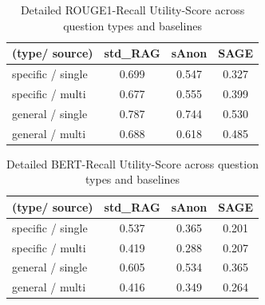 \begin{table}[h!]
\centering
\caption{Detailed ROUGE1-Recall Utility-Score across question types and baselines}
\label{evaluation-tab:utility-rouge-details}
\begin{tabular}{l c c c}
\toprule
\textbf{(type/ source)} & \textbf{std\_RAG} & \textbf{sAnon} & \textbf{SAGE} \\
\midrule
specific / single & 0.699 & 0.547 & 0.327 \\
specific / multi & 0.677 & 0.555 & 0.399 \\
general / single & 0.787 & 0.744 & 0.530 \\
general / multi & 0.688 & 0.618 & 0.485 \\
\bottomrule
\end{tabular}
\end{table}


\begin{table}[h!]
\centering
\caption{Detailed BERT-Recall Utility-Score across question types and baselines}
\label{evaluation-tab:utility-bert-details}
\begin{tabular}{l c c c}
\toprule
\textbf{(type/ source)} & \textbf{std\_RAG} & \textbf{sAnon} & \textbf{SAGE} \\
\midrule
specific / single & 0.537 & 0.365 & 0.201 \\
specific / multi & 0.419 & 0.288 & 0.207 \\
general / single & 0.605 & 0.534 & 0.365 \\
general / multi & 0.416 & 0.349 & 0.264 \\
\bottomrule
\end{tabular}
\end{table}